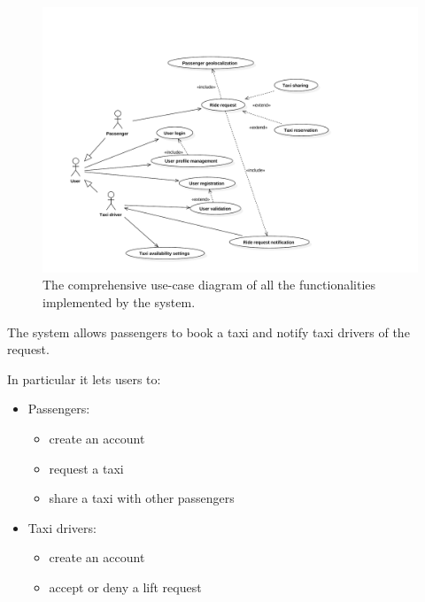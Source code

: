 \begin{figure}[ht]
\includegraphics[width=\textwidth]{diagrams/usecase_whole.pdf}
\caption{The comprehensive use-case diagram of all the functionalities implemented by the system.}
\end{figure}
The system allows passengers to book a taxi and notify taxi drivers of the request.

In particular it lets users to:
\begin{itemize}
\item Passengers:
    \begin{itemize}
    \item create an account
    \item request a taxi
    \item share a taxi with other passengers
    \end{itemize}
\item Taxi drivers:
    \begin{itemize}
    \item create an account
    \item accept or deny a lift request
    \end{itemize}
\end{itemize}
